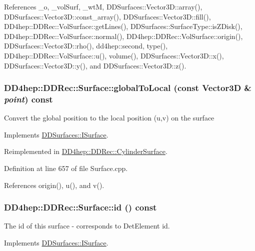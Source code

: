 References \_\-o, \_\-volSurf, \_\-wtM, DDSurfaces::Vector3D::array(), DDSurfaces::Vector3D::const\_\-array(), DDSurfaces::Vector3D::fill(), DD4hep::DDRec::VolSurface::getLines(), DDSurfaces::SurfaceType::isZDisk(), DD4hep::DDRec::VolSurface::normal(), DD4hep::DDRec::VolSurface::origin(), DDSurfaces::Vector3D::rho(), dd4hep::second, type(), DD4hep::DDRec::VolSurface::u(), volume(), DDSurfaces::Vector3D::x(), DDSurfaces::Vector3D::y(), and DDSurfaces::Vector3D::z().\hypertarget{class_d_d4hep_1_1_d_d_rec_1_1_surface_a3c42b99943d5670d31ee67a90bdbafbd}{
\subsubsection[{globalToLocal}]{ DD4hep::DDRec::Surface::globalToLocal (const {\bf Vector3D} \& {\em point}) const}}
\label{class_d_d4hep_1_1_d_d_rec_1_1_surface_a3c42b99943d5670d31ee67a90bdbafbd}
Convert the global position to the local position (u,v) on the surface 

Implements \hyperlink{class_d_d_surfaces_1_1_i_surface_a0d6db86d4871584a9e72ac6018229737}{DDSurfaces::ISurface}.

Reimplemented in \hyperlink{class_d_d4hep_1_1_d_d_rec_1_1_cylinder_surface_ad5772b2599d37ee4280dc074873aef40}{DD4hep::DDRec::CylinderSurface}.

Definition at line 657 of file Surface.cpp.

References origin(), u(), and v().\hypertarget{class_d_d4hep_1_1_d_d_rec_1_1_surface_a563f289fbf049099a6bd37433d853a53}{
\subsubsection[{id}]{ DD4hep::DDRec::Surface::id () const}}
\label{class_d_d4hep_1_1_d_d_rec_1_1_surface_a563f289fbf049099a6bd37433d853a53}


The id of this surface -\/ corresponds to DetElement id. 

Implements \hyperlink{class_d_d_surfaces_1_1_i_surface_aaf7bf967d4a0652c620ec9754a2b37c1}{DDSurfaces::ISurface}.

